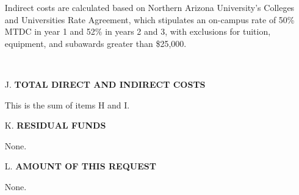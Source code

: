 \documentclass[11pt]{article}
\begin{document}
\begin{enumerate}[leftmargin=*]
Indirect costs are calculated based on Northern Arizona University's Colleges and Universities Rate Agreement, which stipulates an on-campus rate of 50\% MTDC in year 1 and 52\% in years 2 and 3, with exclusions for tuition, equipment, and subawards greater than \$25,000.

\ \hfill {}

\item[J.] \textbf{TOTAL DIRECT AND INDIRECT COSTS}

This is the sum of items H and I. \hfill {}

\item[K.] \textbf{RESIDUAL FUNDS}

None. \hfill {}

\item[L.] \textbf{AMOUNT OF THIS REQUEST}

None. \hfill {}

\end{enumerate}
\end{document}
